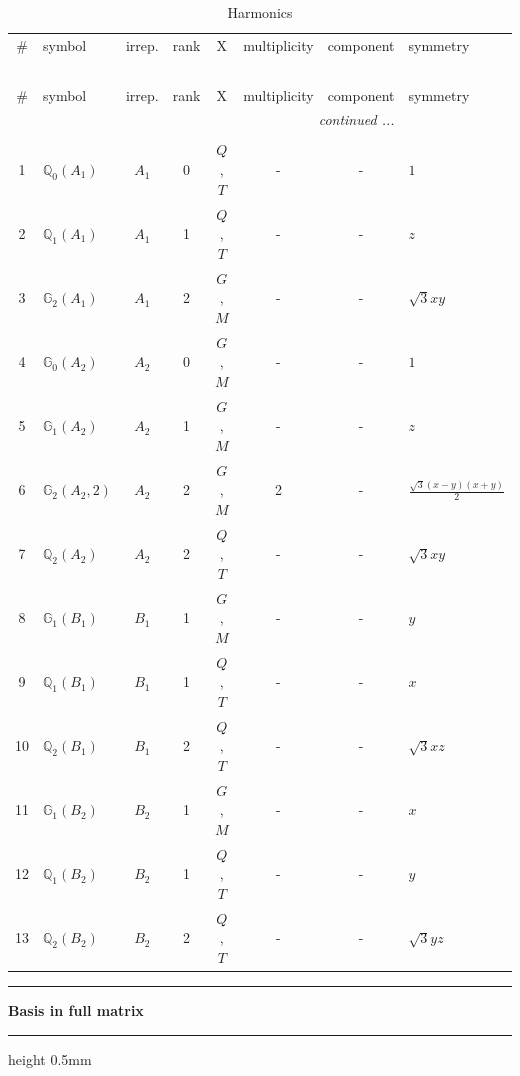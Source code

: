 \documentclass[fleqn,10pt,landscape]{jsarticle}
\begin{document}
\renewcommand{\arraystretch}{1.6}
\begin{longtable}[l]{clcccccl}
\captionsetup{justification=raggedright, singlelinecheck=off}
\caption{Harmonics}
 \\
 \hline \hline
\# & symbol & irrep. & rank & X & multiplicity & component & symmetry \\ \hline \endfirsthead

\multicolumn{7}{l}{\tablename\ \thetable{}} \\
 \hline \hline
\# & symbol & irrep. & rank & X & multiplicity & component & symmetry \\ \hline \endhead

 \hline \hline
\multicolumn{7}{r}{\footnotesize\it continued ...} \\ \endfoot

 \hline \hline
\multicolumn{7}{r}{} \\ \endlastfoot

1 & $\mathbb{Q}_{0}(A_{1})$ & $A_{1}$ & 0 & $Q$, $T$ & - & - & $1$ \\ \hline
2 & $\mathbb{Q}_{1}(A_{1})$ & $A_{1}$ & 1 & $Q$, $T$ & - & - & $z$ \\ \hline
3 & $\mathbb{G}_{2}(A_{1})$ & $A_{1}$ & 2 & $G$, $M$ & - & - & $\sqrt{3} x y$ \\ \hline
4 & $\mathbb{G}_{0}(A_{2})$ & $A_{2}$ & 0 & $G$, $M$ & - & - & $1$ \\ \hline
5 & $\mathbb{G}_{1}(A_{2})$ & $A_{2}$ & 1 & $G$, $M$ & - & - & $z$ \\ \hline
6 & $\mathbb{G}_{2}(A_{2},2)$ & $A_{2}$ & 2 & $G$, $M$ & 2 & - & $\frac{\sqrt{3} \left(x - y\right) \left(x + y\right)}{2}$ \\ \hline
7 & $\mathbb{Q}_{2}(A_{2})$ & $A_{2}$ & 2 & $Q$, $T$ & - & - & $\sqrt{3} x y$ \\ \hline
8 & $\mathbb{G}_{1}(B_{1})$ & $B_{1}$ & 1 & $G$, $M$ & - & - & $y$ \\ \hline
9 & $\mathbb{Q}_{1}(B_{1})$ & $B_{1}$ & 1 & $Q$, $T$ & - & - & $x$ \\ \hline
10 & $\mathbb{Q}_{2}(B_{1})$ & $B_{1}$ & 2 & $Q$, $T$ & - & - & $\sqrt{3} x z$ \\ \hline
11 & $\mathbb{G}_{1}(B_{2})$ & $B_{2}$ & 1 & $G$, $M$ & - & - & $x$ \\ \hline
12 & $\mathbb{Q}_{1}(B_{2})$ & $B_{2}$ & 1 & $Q$, $T$ & - & - & $y$ \\ \hline
13 & $\mathbb{Q}_{2}(B_{2})$ & $B_{2}$ & 2 & $Q$, $T$ & - & - & $\sqrt{3} y z$ \\
\end{longtable}
\vspace{5mm}
\noindent \rule[0.5mm]{5mm}{0.5mm}\hspace{3mm}\textbf{Basis in full matrix}\hspace{3mm}\leaders\hrule height 0.5mm\hfill\kern0pt
\vspace{3mm}
\end{document}
